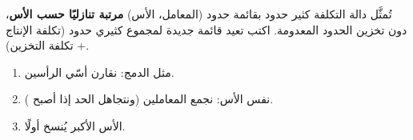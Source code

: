 \begin{statement}
تُمثَّل دالة التكلفة كثير حدود بقائمة حدود (المعامل، الأس) \textbf{مرتبة تنازليًا حسب الأس}، دون تخزين الحدود المعدومة. اكتب  تعيد قائمة جديدة لمجموع كثيري حدود (تكلفة الإنتاج + تكلفة التخزين).
\end{statement}
\begin{stepsbox}\begin{enumerate}
\item مثل الدمج: نقارن أسّي الرأسين.
\item نفس الأس: نجمع المعاملين (ونتجاهل الحد إذا أصبح ).
\item الأس الأكبر يُنسخ أولًا.
\end{enumerate}\end{stepsbox}
